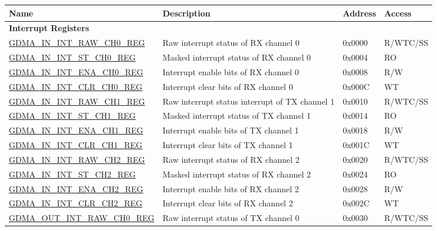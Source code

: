\begin{longtable}{ | p{6.7cm} | p{6cm} | p{1.3cm} | p{1.5cm} | }
\hline\rowcolor{lightgray}
\textbf{Name} & \textbf{Description} &  \textbf{Address} & \textbf{Access} \\ \hline
\endhead
\multicolumn{4}{|l|}{\textbf{Interrupt Registers}} \\ \hline
\hyperref[regdesc:GDMAININTRAWCHNREG]{GDMA\_IN\_INT\_RAW\_CH0\_REG} & Raw interrupt status of RX channel 0 & 0x0000 & R/WTC/SS \\ \hline
\hyperref[regdesc:GDMAININTSTCHNREG]{GDMA\_IN\_INT\_ST\_CH0\_REG} & Masked interrupt status of RX channel 0 & 0x0004 & RO \\ \hline
\hyperref[regdesc:GDMAININTENACHNREG]{GDMA\_IN\_INT\_ENA\_CH0\_REG} & Interrupt enable bits of RX channel 0 & 0x0008 & R/W \\ \hline
\hyperref[regdesc:GDMAININTCLRCHNREG]{GDMA\_IN\_INT\_CLR\_CH0\_REG} & Interrupt clear bits of RX channel 0 & 0x000C & WT \\ \hline
\hyperref[regdesc:GDMAININTRAWCHNREG]{GDMA\_IN\_INT\_RAW\_CH1\_REG} & Raw interrupt status interrupt of TX channel 1 & 0x0010 & R/WTC/SS \\ \hline
\hyperref[regdesc:GDMAININTSTCHNREG]{GDMA\_IN\_INT\_ST\_CH1\_REG} & Masked interrupt status of TX channel 1 & 0x0014 & RO \\ \hline
\hyperref[regdesc:GDMAININTENACHNREG]{GDMA\_IN\_INT\_ENA\_CH1\_REG} & Interrupt enable bits of TX channel 1 & 0x0018 & R/W \\ \hline
\hyperref[regdesc:GDMAININTCLRCHNREG]{GDMA\_IN\_INT\_CLR\_CH1\_REG} & Interrupt clear bits of TX channel 1 & 0x001C & WT \\ \hline
\hyperref[regdesc:GDMAININTRAWCHNREG]{GDMA\_IN\_INT\_RAW\_CH2\_REG} & Raw interrupt status of RX channel 2 & 0x0020 & R/WTC/SS \\ \hline
\hyperref[regdesc:GDMAININTSTCHNREG]{GDMA\_IN\_INT\_ST\_CH2\_REG} & Masked interrupt status of RX channel 2 & 0x0024 & RO \\ \hline
\hyperref[regdesc:GDMAININTENACHNREG]{GDMA\_IN\_INT\_ENA\_CH2\_REG} & Interrupt enable bits of RX channel 2 & 0x0028 & R/W \\ \hline
\hyperref[regdesc:GDMAININTCLRCHNREG]{GDMA\_IN\_INT\_CLR\_CH2\_REG} & Interrupt clear bits of RX channel 2 & 0x002C & WT \\ \hline
\hyperref[regdesc:GDMAOUTINTRAWCHNREG]{GDMA\_OUT\_INT\_RAW\_CH0\_REG} & Raw interrupt status of TX channel 0 & 0x0030 & R/WTC/SS \\ \hline

\end{longtable}
